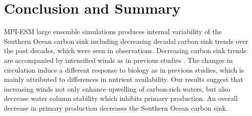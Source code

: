 \chapter{Conclusion and Summary}\label{ch:summary} %

MPI-ESM large ensemble simulations produces internal variability of the Southern Ocean carbon sink including decreasing decadal carbon sink trends over the past decades, which were seen in observations. Decreasing carbon sink trends are accompanied by intensified winds as in previous studies \citep{LeQuere2007,Lovenduski2008}. The changes in circulation induce a different response to biology as in previous studies\citep{Lovenduski2005,Hauck2013,wang2012}, which is mainly attributed to differences in nutrient availability. Our results suggest that increasing winds not only enhance upwelling of carbon-rich waters, but also decrease water column stability which inhibits primary production. An overall decrease in primary production decreases the Southern Ocean carbon sink. 


